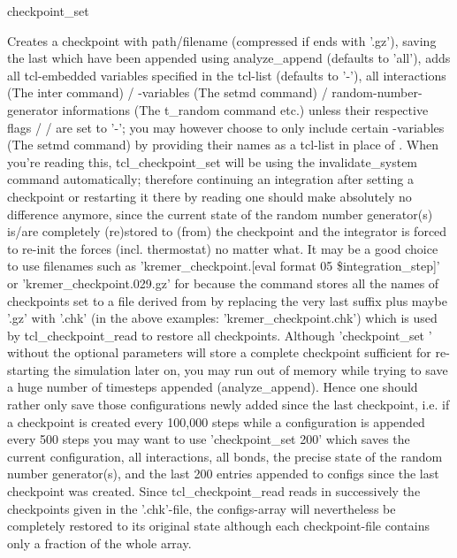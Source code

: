 \begin{essyntax}
  checkpoint_set  
\end{essyntax}
Creates a checkpoint with path/filename  (compressed
if  ends with '.gz'), saving the last  which have been appended using analyze\_append (defaults to
'all'), adds all tcl-embedded variables specified in the tcl-list
 (defaults to '-'), all interactions (The inter command) /
\es{}-variables (The setmd command) / random-number-generator
informations (The t\_random command etc.) unless their respective
flags  /  /  are set to '-'; you
may however choose to only include certain \es-variables (The setmd
command) by providing their names as a tcl-list in place of
.  When you're reading this, tcl\_checkpoint\_set will be
using the invalidate\_system command automatically; therefore
continuing an integration after setting a checkpoint or restarting it
there by reading one should make absolutely no difference anymore,
since the current state of the random number generator(s) is/are
completely (re)stored to (from) the checkpoint and the integrator is
forced to re-init the forces (incl. thermostat) no matter what.  It
may be a good choice to use filenames such as
'kremer\_checkpoint.[eval format 05 \$integration\_step]' or
'kremer\_checkpoint.029.gz' for  because the command
stores all the names of checkpoints set to a file derived from
 by replacing the very last suffix plus maybe '.gz'
with '.chk' (in the above examples: 'kremer\_checkpoint.chk') which is
used by tcl\_checkpoint\_read to restore all checkpoints.  Although
'checkpoint\_set ' without the optional parameters
will store a complete checkpoint sufficient for re-starting the
simulation later on, you may run out of memory while trying to save a
huge number of timesteps appended (analyze\_append). Hence one should
rather only save those configurations newly added since the last
checkpoint, i.e. if a checkpoint is created every 100,000 steps while
a configuration is appended every 500 steps you may want to use
'checkpoint\_set  200' which saves the current
configuration, all interactions, all bonds, the precise state of the
random number generator(s), and the last 200 entries appended to
configs since the last checkpoint was created. Since
tcl\_checkpoint\_read reads in successively the checkpoints given in
the '.chk'-file, the configs-array will nevertheless be completely
restored to its original state although each checkpoint-file contains
only a fraction of the whole array.

